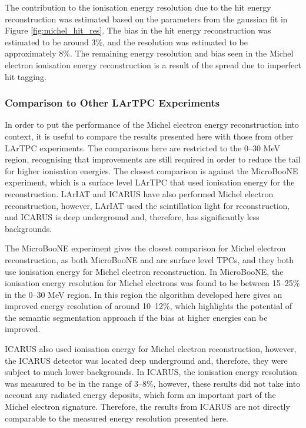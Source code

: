 The contribution to the ionisation energy resolution due to the hit energy
reconstruction was estimated based on the parameters from the gaussian fit in
Figure \ref{fig:michel_hit_res}. The bias in the hit energy reconstruction was
estimated to be around 3\%, and the resolution was estimated to be
approximately 8\%. The remaining energy resolution and bias seen in the Michel
electron ionisation energy reconstruction is a result of the spread due to
imperfect hit tagging.

\subsubsection*{Comparison to Other LArTPC Experiments} \label{ME_COMP}

In order to put the performance of the Michel electron energy
reconstruction into context, it is useful to compare the results presented
here with those from other LArTPC experiments. The comparisons here are
restricted to the 0--30 MeV region, recognising that improvements are still 
required in order to reduce the tail for higher ionisation energies. The closest
comparison is against the MicroBooNE experiment, which is a surface level LArTPC
that used ionisation energy for the reconstruction\cite{Acciarri:2017sjy}. 
LArIAT and ICARUS have also performed Michel electron 
reconstruction\cite{Amoruso:2003sw,Foreman_2016}, however, LArIAT used the 
scintillation light for reconstruction, and ICARUS is deep underground and, 
therefore, has significantly less backgrounds.

The MicroBooNE experiment gives the closest comparison for Michel electron
reconstruction, as both MicroBooNE and \protodune{} are surface level TPCs, and
they both use ionisation energy for Michel electron reconstruction. In
MicroBooNE, the ionisation energy resolution for Michel electrons was found to
be between 15--25\% in the 0--30 MeV region\cite{Acciarri:2017sjy}. In this 
region the algorithm developed here gives an improved energy resolution of 
around 10--12\%, which highlights the potential of the semantic segmentation 
approach if the bias at higher energies can be improved.

ICARUS also used ionisation energy for Michel electron reconstruction, however,
the ICARUS detector was located deep underground and, therefore, they were
subject to much lower backgrounds. In ICARUS, the ionisation energy resolution
was measured to be in the range of 3--8\%\cite{Amoruso:2003sw}, however, these
results did not take into account any radiated energy deposits, which form an
important part of the Michel electron signature. Therefore, the results from
ICARUS are not directly comparable to the measured energy resolution presented
here.

